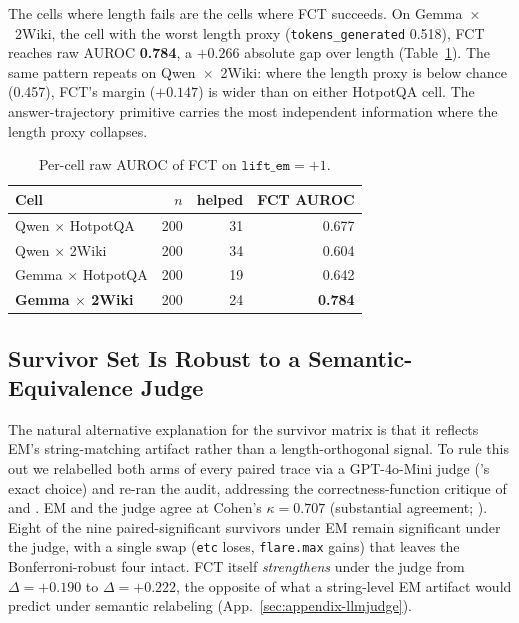 \documentclass[11pt]{article}
\begin{document}
The cells where length fails are the cells where FCT succeeds. On Gemma~$\times$~2Wiki, the cell with the worst length proxy (\texttt{tokens\_generated} 0.518), FCT reaches raw AUROC \textbf{0.784}, a $+0.266$ absolute gap over length (Table~\ref{tab:fct-percell}). The same pattern repeats on Qwen~$\times$~2Wiki: where the length proxy is below chance (0.457), FCT's margin ($+0.147$) is wider than on either HotpotQA cell. The answer-trajectory primitive carries the most independent information where the length proxy collapses.

\begin{table}[h]
\centering\small
\begin{tabular}{@{}lrrr@{}}
\toprule
\textbf{Cell} & $n$ & \textbf{helped} & \textbf{FCT AUROC} \\
\midrule
Qwen $\times$ HotpotQA  & 200 & 31 & 0.677 \\
Qwen $\times$ 2Wiki     & 200 & 34 & 0.604 \\
Gemma $\times$ HotpotQA & 200 & 19 & 0.642 \\
\textbf{Gemma $\times$ 2Wiki} & 200 & 24 & \textbf{0.784} \\
\bottomrule
\end{tabular}
\caption{Per-cell raw AUROC of FCT on $\texttt{lift\_em}{=}+1$.}
\label{tab:fct-percell}
\end{table}

\subsection{Survivor Set Is Robust to a Semantic-Equivalence Judge}
\label{sec:results-llmjudge}

The natural alternative explanation for the survivor matrix is that it reflects EM's string-matching artifact rather than a length-orthogonal signal. To rule this out we relabelled both arms of every paired trace via a GPT-4o-Mini judge (\citeauthor{janiak_illusion_nodate}'s exact choice) and re-ran the audit, addressing the correctness-function critique of \citet{janiak_illusion_nodate} and \citet{ielanskyi_addressing_2025}. EM and the judge agree at Cohen's $\kappa = 0.707$ (substantial agreement; \citealp{landis_measurement_1977}). Eight of the nine paired-significant survivors under EM remain significant under the judge, with a single swap (\texttt{etc} loses, \texttt{flare.max} gains) that leaves the Bonferroni-robust four intact. FCT itself \emph{strengthens} under the judge from $\Delta = +0.190$ to $\Delta = +0.222$, the opposite of what a string-level EM artifact would predict under semantic relabeling (App.~\ref{sec:appendix-llmjudge}).
\end{document}

